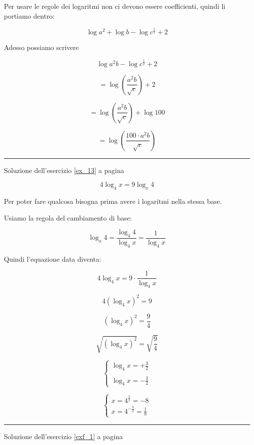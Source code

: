 Per usare le regole dei logaritmi non ci devono essere coefficienti, quindi li portiamo dentro:

\[
\log a^2+\log b-\log c^{\frac{1}{2}}+2
\]

Adesso possiamo scrivere

\[
\log a^2b-\log  c^{\frac{1}{2}}+2
\]

\[
=\log\left(
\frac{
a^2b
}{
\sqrt{c}
}
\right)+2
\]

\[
=\log\left(
\frac{
a^2b
}{
\sqrt{c}
}
\right)+\log100
\]

\[
=\log\left(
\frac{
100\cdot a^2b
}{
\sqrt{c}
}
\right)
\]



\vspace{1cm}
\hrule
\vspace{1cm}

Soluzione dell'esercizio \ref{ex_13} a pagina \pageref{ex_13}\label{sol_13}

\[
4\log_4 x=9\log_x 4
\]

Per poter fare qualcosa bisogna prima avere i logaritmi nella stessa base.

Usiamo la regola del cambiamento di base:

\[
\log_x 4=\frac{
\log_4 4
}{
\log_4 x
}=\frac{
1
}{
\log_4 x
}
\]

Quindi l'equazione data diventa:

\[
4\log_4 x=9 \cdot\frac{
1
}{
\log_4 x
}
\]


\[
4(\log_4 x)^2 = 9
\]

\[
(\log_4 x)^2 = \frac{9}{4}
\]

\[
\sqrt{(\log_4 x)^2} = \sqrt{\frac{9}{4}}
\]


\[
\left\{
\begin{array}{ll}
\log_4 x=+\frac{3}{2}\\
\\
\log_4 x=-\frac{3}{2}
\end{array}
\right.
\]


\[
\left\{
\begin{array}{ll}
x=4^{\frac{3}{2}}=-8\\
x=4^{-\frac{3}{2}}=\frac{1}{8}
\end{array}
\right.
\]


\vspace{1cm}
\hrule
\vspace{1cm}


Soluzione dell'esercizio \ref{exf_1} a pagina \pageref{exf_1}\label{solf_1}

